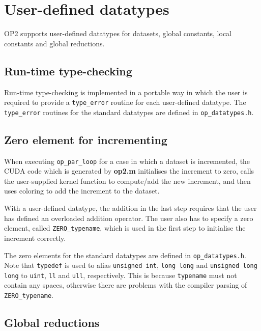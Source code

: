 \documentclass[12pt]{article}
\begin{document}

\section{User-defined datatypes}

OP2 supports user-defined datatypes for datasets, global constants, local constants 
and global reductions.

\subsection{Run-time type-checking}


Run-time type-checking is implemented in a portable way in which the user 
is required to provide a {\tt type\_error} routine for each user-defined 
datatype.  The {\tt type\_error} routines for the standard datatypes are 
defined in {\tt op\_datatypes.h}.  

\subsection{Zero element for incrementing}

When executing {\tt op\_par\_loop} for a case in which a dataset is 
incremented, the CUDA code which is generated by {\bf op2.m} 
initialises the increment to zero, calls the user-supplied kernel
function to compute/add the new increment, and then uses coloring to 
add the increment to the dataset.

With a user-defined datatype, the addition in the last step requires
that the user has defined an overloaded addition operator.  The user
also has to specify a zero element, called {\tt ZERO\_typename},
which is used in the first step to initialise the increment correctly.

The zero elements for the standard datatypes are defined in 
{\tt op\_datatypes.h}.  Note that {\tt typedef} is used to alias 
{\tt unsigned int}, {\tt long long} and {\tt unsigned long long} to 
{\tt uint}, {\tt ll} and {\tt ull}, respectively.  This is because 
{\tt typename} must not contain any spaces, otherwise there are problems
with the compiler parsing of {\tt ZERO\_typename}.

\subsection{Global reductions}
\end{document}

